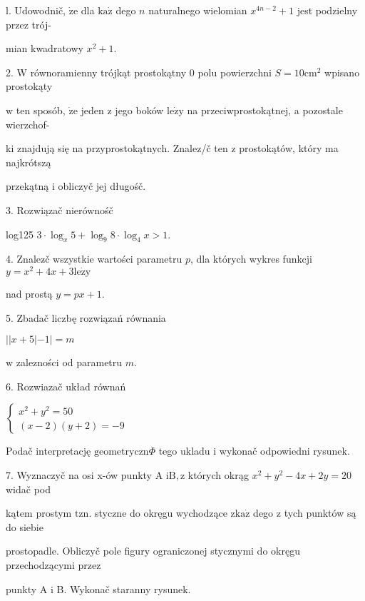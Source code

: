 \documentclass[a4paper,12pt]{article}
\begin{document}
l. Udowodnič, $\dot{\mathrm{z}}\mathrm{e}$ dla $\mathrm{k}\mathrm{a}\dot{\mathrm{z}}$ dego $n$ naturalnego wielomian $x^{4n-2}+1$ jest podzielny przez trój-

mian kwadratowy $x^{2}+1.$

2. $\mathrm{W}$ równoramienny trójkąt prostokątny $0$ polu powierzchni $S=10\mathrm{c}\mathrm{m}^{2}$ wpisano prostokąty

$\mathrm{w}$ ten sposób, $\dot{\mathrm{z}}\mathrm{e}$ jeden $\mathrm{z}$ jego boków $\mathrm{l}\mathrm{e}\dot{\mathrm{z}}\mathrm{y}$ na przeciwprostokątnej, a pozostale wierzchof-

ki znajdują się na przyprostokątnych. Znalez/č ten $\mathrm{z}$ prostokątów, który ma najkrótszą

przekątną $\mathrm{i}$ obliczyč jej długośč.

3. Rozwiązač nierównośč

log125 $3\cdot\log_{x}5+\log_{9}8\cdot\log_{4}x>1.$

4. Znalez$\acute{}$č wszystkie wartości parametru $p$, dla których wykres funkcji $y=x^{2}+4x+3\mathrm{l}\mathrm{e}\dot{\mathrm{z}}\mathrm{y}$

nad prostą $y=px+1.$

5. Zbadač liczbę rozwiązań równania

$||x+5|-1|=m$

$\mathrm{w}$ zalezności od parametru $m.$

6. Rozwiazač układ równań

$\left\{\begin{array}{l}
x^{2}+y^{2}=50\\
(x-2)(y+2)=-9
\end{array}\right.$

Podač interpretację $\mathrm{g}\mathrm{e}\mathrm{o}\mathrm{m}\mathrm{e}\mathrm{t}\mathrm{r}\mathrm{y}\mathrm{c}\mathrm{z}\mathrm{n}\Phi$ tego ukladu $\mathrm{i}$ wykonač odpowiedni rysunek.

7. Wyznaczyč na osi x-ów punkty A $\mathrm{i}\mathrm{B}, \mathrm{z}$ których okrąg $x^{2}+y^{2}-4x+2y=20$ widač pod

kątem prostym $\mathrm{t}\mathrm{z}\mathrm{n}$. styczne do okręgu wychodzące $\mathrm{z}\mathrm{k}\mathrm{a}\dot{\mathrm{z}}$ dego $\mathrm{z}$ tych punktów są do siebie

prostopadle. Obliczyč pole figury ograniczonej stycznymi do okręgu przechodzącymi przez

punkty A $\mathrm{i}$ B. Wykonač staranny rysunek.
\end{document}
